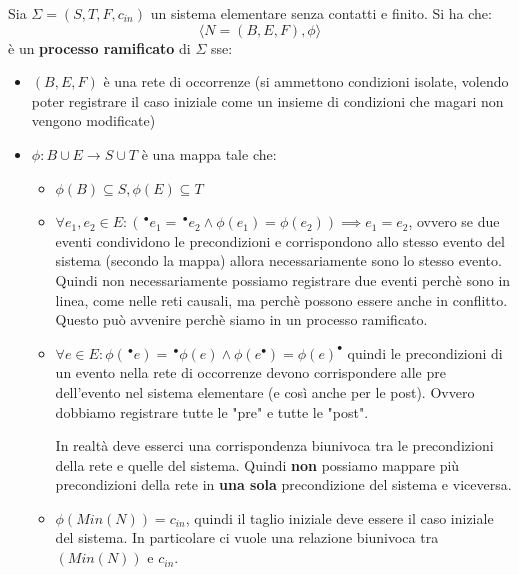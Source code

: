 \begin{definizione}
  Sia $\Sigma=(S, T, F, c_{in})$ un sistema elementare senza contatti e
  finito. Si ha che:
  \[\langle N=(B, E, F), \phi\rangle\]
  è un \textbf{processo ramificato} di $\Sigma$ sse:
  \begin{itemize}
    \item $(B, E, F)$ è una rete di occorrenze (si ammettono condizioni isolate,
    volendo poter registrare il caso iniziale come un insieme di condizioni che
    magari non vengono modificate)
    \item $\phi:B\cup E\to S\cup T$ è una mappa tale che:
    \begin{itemize}
      \item $\phi(B)\subseteq S, \phi(E)\subseteq T$
      \item $\forall e_1, e_2\in E:(\,^\bullet e_1=\,^\bullet e_2\land
      \phi(e_1)=\phi(e_2))\implies e_1=e_2$, ovvero se due eventi condividono le
      precondizioni e corrispondono allo stesso evento del sistema (secondo la
      mappa) allora necessariamente sono lo stesso evento. Quindi non necessariamente possiamo registrare due eventi perchè sono in linea, come nelle reti causali, ma perchè possono essere anche in conflitto. Questo può avvenire perchè siamo in un processo ramificato.
      \item $\forall e\in E:\phi(\,^\bullet e)=\,^\bullet
      \phi(e)\land\phi(e^\bullet)=\phi(e)^\bullet$ quindi le precondizioni di un
      evento nella rete di occorrenze devono corrispondere alle pre dell'evento nel
      sistema elementare (e così anche per le post). Ovvero dobbiamo registrare tutte le "pre" e tutte le "post". 
      \begin{nota}
        In realtà deve esserci una corrispondenza biunivoca tra le precondizioni della rete e quelle del sistema. Quindi \textbf{non} possiamo mappare più precondizioni della rete in \textbf{una sola } precondizione del sistema e viceversa.
      \end{nota}
      \item $\phi(Min(N))=c_{in}$, quindi il taglio iniziale deve essere il caso
      iniziale del sistema. In particolare ci vuole una relazione biunivoca tra $(Min(N))$ e $c_{in}$.
    \end{itemize}
  \end{itemize}
\end{definizione} \vspace{5mm} %
